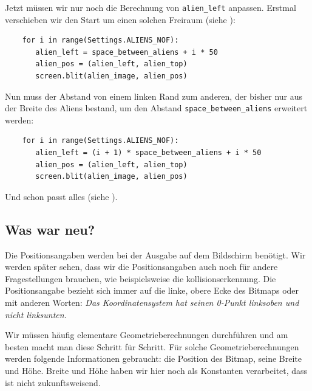 Jetzt müssen wir nur noch die Berechnung von \texttt{alien\_left} anpassen. Erstmal verschieben wir den Start um einen solchen Freiraum (siehe ):

\lstset{firstnumber=41}
\begin{lstlisting}
	for i in range(Settings.ALIENS_NOF):
	   alien_left = space_between_aliens + i * 50
	   alien_pos = (alien_left, alien_top)
	   screen.blit(alien_image, alien_pos)
\end{lstlisting}


Nun muss der Abstand von einem linken Rand zum anderen, der bisher nur aus der Breite des Aliens bestand, um den Abstand \texttt{space\_between\_aliens} erweitert werden:

\lstset{firstnumber=41}
\begin{lstlisting}
	for i in range(Settings.ALIENS_NOF):
	   alien_left = (i + 1) * space_between_aliens + i * 50
	   alien_pos = (alien_left, alien_top)
	   screen.blit(alien_image, alien_pos)
\end{lstlisting} 

Und schon passt alles (siehe ).



\subsection*{Was war neu?}

Die Positionsangaben werden bei der Ausgabe auf dem Bildschirm benötigt. Wir werden später sehen, dass wir die Positionsangaben auch noch für andere Fragestellungen brauchen, wie beispielsweise die \Gls{kollisionserkennung}. Die Positionsangabe bezieht sich immer auf die linke, obere Ecke des Bitmaps oder mit anderen Worten: \emph{Das Koordinatensystem hat seinen 0-Punkt linksoben und nicht linksunten.}
	
Wir müssen häufig elementare Geometrieberechnungen durchführen und am besten macht man diese Schritt für Schritt. Für solche Geometrieberechnungen werden folgende Informationen gebraucht: die Position des Bitmap, seine Breite und Höhe. Breite und Höhe haben wir hier noch als Konstanten verarbeitet, dass ist nicht zukunftsweisend.


